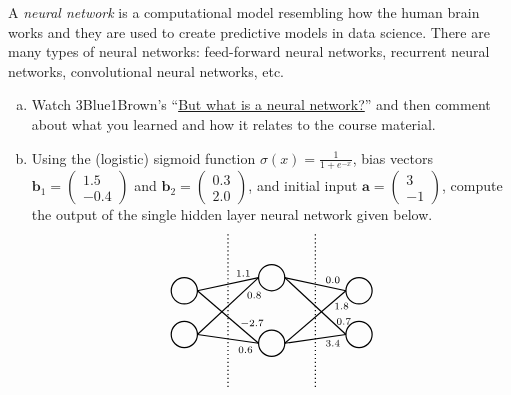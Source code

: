 \documentclass[11pt,letterpaper]{article}
\begin{document}
 A \textit{neural network} is a computational model resembling how the human brain works and they are used to create predictive models in data science. There are many types of neural networks: feed-forward neural networks, recurrent neural networks, convolutional neural networks, etc. 
	\begin{enumerate}[(a)]
	\item Watch 3Blue1Brown's ``\href{https://www.youtube.com/watch?v=aircAruvnKk&list=PLZHQObOWTQDNU6R1_67000Dx_ZCJB-3pi&ab_channel=3Blue1Brown}{But what is a neural network?}'' and then comment about what you learned and how it relates to the course material. 
	\item Using the (logistic) sigmoid function $\sigma(x)= \frac{1}{1 + e^{-x}}$, bias vectors $\mathbf{b}_1= \begin{pmatrix} 1.5 \\ -0.4 \end{pmatrix}$ and $\mathbf{b}_2= \begin{pmatrix} 0.3 \\ 2.0 \end{pmatrix}$, and initial input $\mathbf{a}= \begin{pmatrix} 3 \\ -1 \end{pmatrix}$, compute the output of the single hidden layer neural network given below. 
		\[
		\begin{tikzpicture}[scale=1.1]
		\draw[line width=0.03cm] (0,0.2) circle (0.3);
		\draw[line width=0.03cm] (0,1.2) circle (0.3);
		
		\draw[line width=0.03cm] (2,0) circle (0.3);
		\draw[line width=0.03cm] (2,1.5) circle (0.3);
		
		\draw[line width=0.03cm] (4,0.2) circle (0.3);
		\draw[line width=0.03cm] (4,1.2) circle (0.3);
		
		\draw[line width=0.03cm,dotted] (1,-1) -- (1,2.5);
		\draw[line width=0.03cm,dotted] (3,-1) -- (3,2.5);
		
		\draw[line width=0.03cm] (0.3,1.2) -- (1.7,1.5);
		\draw[line width=0.03cm] (0.3,1.2) -- (1.7,0);
		\draw[line width=0.03cm] (0.3,0.2) -- (1.7,1.5);
		\draw[line width=0.03cm] (0.3,0.2) -- (1.7,0);
		
		\draw[line width=0.03cm] (2.3,1.5) -- (3.7,1.2);
		\draw[line width=0.03cm] (2.3,1.5) -- (3.7,0.2);
		\draw[line width=0.03cm] (2.3,0) -- (3.7,1.2);
		\draw[line width=0.03cm] (2.3,0) -- (3.7,0.2);
		
		\node at (1.35,1.6) {\scriptsize$1.1$};
		\node at (1.6,1.1) {\scriptsize$0.8$};
		\node at (1.55,0.45) {\scriptsize$-2.7$};
		\node at (1.4,-0.15) {\scriptsize$0.6$};
		
		\node at (3.4,1.45) {\scriptsize$0.0$};
		\node at (3.6,0.85) {\scriptsize$1.8$};
		\node at (3.65,0.5) {\scriptsize$0.7$};
		\node at (3.4,0) {\scriptsize$3.4$};
		\end{tikzpicture}
		\]
	\end{enumerate}
\end{document}
